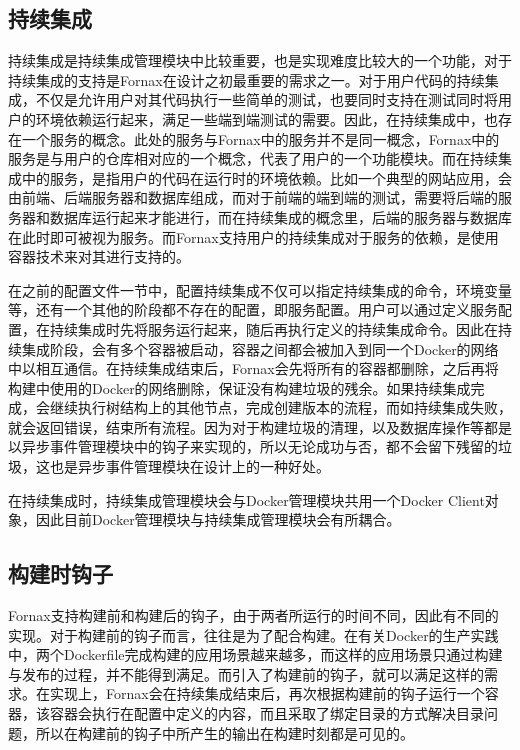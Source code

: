 \subsection{持续集成}

持续集成是持续集成管理模块中比较重要，也是实现难度比较大的一个功能，对于持续集成的支持是Fornax在设计之初最重要的需求之一。对于用户代码的持续集成，不仅是允许用户对其代码执行一些简单的测试，也要同时支持在测试同时将用户的环境依赖运行起来，满足一些端到端测试的需要。因此，在持续集成中，也存在一个服务的概念。此处的服务与Fornax中的服务并不是同一概念，Fornax中的服务是与用户的仓库相对应的一个概念，代表了用户的一个功能模块。而在持续集成中的服务，是指用户的代码在运行时的环境依赖。比如一个典型的网站应用，会由前端、后端服务器和数据库组成，而对于前端的端到端的测试，需要将后端的服务器和数据库运行起来才能进行，而在持续集成的概念里，后端的服务器与数据库在此时即可被视为服务。而Fornax支持用户的持续集成对于服务的依赖，是使用容器技术来对其进行支持的。

在之前的配置文件一节中，配置持续集成不仅可以指定持续集成的命令，环境变量等，还有一个其他的阶段都不存在的配置，即服务配置。用户可以通过定义服务配置，在持续集成时先将服务运行起来，随后再执行定义的持续集成命令。因此在持续集成阶段，会有多个容器被启动，容器之间都会被加入到同一个Docker的网络中以相互通信。在持续集成结束后，Fornax会先将所有的容器都删除，之后再将构建中使用的Docker的网络删除，保证没有构建垃圾的残余。如果持续集成完成，会继续执行树结构上的其他节点，完成创建版本的流程，而如持续集成失败，就会返回错误，结束所有流程。因为对于构建垃圾的清理，以及数据库操作等都是以异步事件管理模块中的钩子来实现的，所以无论成功与否，都不会留下残留的垃圾，这也是异步事件管理模块在设计上的一种好处。

在持续集成时，持续集成管理模块会与Docker管理模块共用一个Docker Client对象，因此目前Docker管理模块与持续集成管理模块会有所耦合。

\subsection{构建时钩子}

Fornax支持构建前和构建后的钩子，由于两者所运行的时间不同，因此有不同的实现。对于构建前的钩子而言，往往是为了配合构建。在有关Docker的生产实践中，两个Dockerfile完成构建的应用场景越来越多，而这样的应用场景只通过构建与发布的过程，并不能得到满足。而引入了构建前的钩子，就可以满足这样的需求。在实现上，Fornax会在持续集成结束后，再次根据构建前的钩子运行一个容器，该容器会执行在配置中定义的内容，而且采取了绑定目录的方式解决目录问题，所以在构建前的钩子中所产生的输出在构建时刻都是可见的。

